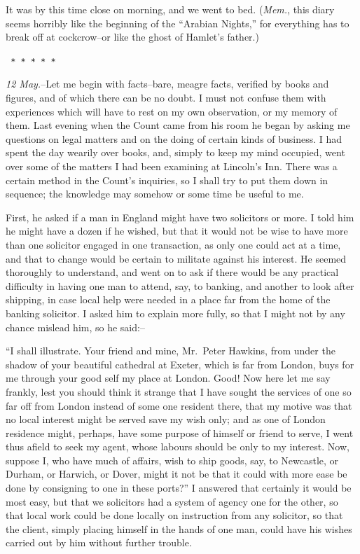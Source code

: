 \documentclass[12pt,openright]{book}
\begin{document}
It was by this time close on morning, and we went to bed. (\textit{Mem.}, this diary seems horribly like the beginning of the “Arabian Nights,” for everything has to break off at cockcrow–or like the ghost of Hamlet’s father.)

\texttt{   *       *       *       *       *}

\textit{12 May.}–Let me begin with facts–bare, meagre facts, verified by books and figures, and of which there can be no doubt. I must not confuse them with experiences which will have to rest on my own observation, or my memory of them. Last evening when the Count came from his room he began by asking me questions on legal matters and on the doing of certain kinds of business. I had spent the day wearily over books, and, simply to keep my mind occupied, went over some of the matters I had been examining at Lincoln’s Inn. There was a certain method in the Count’s inquiries, so I shall try to put them down in sequence; the knowledge may somehow or some time be useful to me.

First, he asked if a man in England might have two solicitors or more. I told him he might have a dozen if he wished, but that it would not be wise to have more than one solicitor engaged in one transaction, as only one could act at a time, and that to change would be certain to militate against his interest. He seemed thoroughly to understand, and went on to ask if there would be any practical difficulty in having one man to attend, say, to banking, and another to look after shipping, in case local help were needed in a place far from the home of the banking solicitor. I asked him to explain more fully, so that I might not by any chance mislead him, so he said:–

“I shall illustrate. Your friend and mine, Mr. Peter Hawkins, from under the shadow of your beautiful cathedral at Exeter, which is far from London, buys for me through your good self my place at London. Good! Now here let me say frankly, lest you should think it strange that I have sought the services of one so far off from London instead of some one resident there, that my motive was that no local interest might be served save my wish only; and as one of London residence might, perhaps, have some purpose of himself or friend to serve, I went thus afield to seek my agent, whose labours should be only to my interest. Now, suppose I, who have much of affairs, wish to ship goods, say, to Newcastle, or Durham, or Harwich, or Dover, might it not be that it could with more ease be done by consigning to one in these ports?” I answered that certainly it would be most easy, but that we solicitors had a system of agency one for the other, so that local work could be done locally on instruction from any solicitor, so that the client, simply placing himself in the hands of one man, could have his wishes carried out by him without further trouble.
\end{document}
